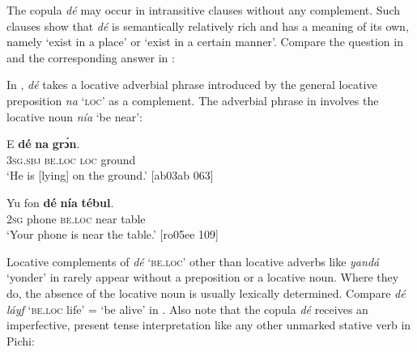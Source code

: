 The copula \textit{dé} may occur in intransitive clauses without any complement. Such clauses show that \textit{dé} is semantically relatively rich and has a meaning of its own, namely ‘exist in a place’ or ‘exist in a certain manner’. Compare the question in  and the corresponding answer in :



\ea%
    \label{ex:key:779}
\z\z

In , \textit{dé} takes a locative adverbial phrase introduced by the general locative preposition \textit{na} ‘\textsc{loc}’ as a complement. The adverbial phrase in  involves the locative noun \textit{nía} ‘be near’:


\ea%
    \label{ex:key:780}
    \gll E    \textbf{dé}    \textbf{na}  \textbf{grɔ́n}.\\
\textsc{3sg.sbj}  \textsc{be.loc}  \textsc{loc}  ground\\

\glt ‘He is [lying] on the ground.’ [ab03ab 063]
\z


\ea%
    \label{ex:key:781}
    \gll Yu  fon    \textbf{dé}    \textbf{nía}    \textbf{tébul}.\\
\textsc{2sg}  phone  \textsc{be.loc}  near    table\\

\glt ‘Your phone is near the table.’ [ro05ee 109]
\z

Locative complements of \textit{dé} ‘\textsc{be.loc}’ other than locative adverbs like \textit{yandá} ‘yonder’ in  rarely appear without a preposition or a locative noun. Where they do, the absence of the locative noun is usually lexically determined. Compare \textit{dé láyf} ‘\textsc{be.loc} life’ = ‘be alive’ in . Also note that the copula \textit{dé} receives an imperfective, present tense interpretation like any other unmarked stative verb in Pichi:



